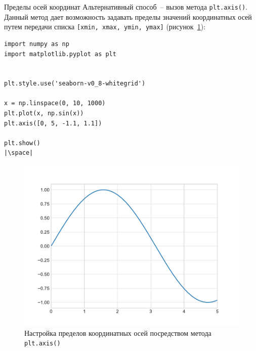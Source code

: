 \documentclass[aspectratio=169, mathserif]{beamer}	%
\begin{document}
\begin{frame}[fragile, label=m]{Пределы осей координат}
\scriptsize
Альтернативный способ~-- вызов метода \texttt{plt.axis()}. Данный метод дает возможность задавать пределы значений координатных осей путем передачи списка \texttt{[xmin, xmax, ymin, ymax]} (рисунок~\ref{fig:fig_9}):
\vfill
\begin{minipage}{.4\textwidth}
\begin{verbatim}
import numpy as np
import matplotlib.pyplot as plt


plt.style.use('seaborn-v0_8-whitegrid')

x = np.linspace(0, 10, 1000)
plt.plot(x, np.sin(x))
plt.axis([0, 5, -1.1, 1.1])

plt.show()
|\space|
\end{verbatim}
\end{minipage}
\begin{minipage}{.59\textwidth}
\begin{figure}[h!]
	\centering
	\includegraphics[width=.85\linewidth]{./pics/Figure_9}
	\caption{Настройка пределов координатных осей посредством метода \texttt{plt.axis()}}
	\label{fig:fig_9}
\end{figure}
\end{minipage}
\vfill
\end{frame}
\end{document}
